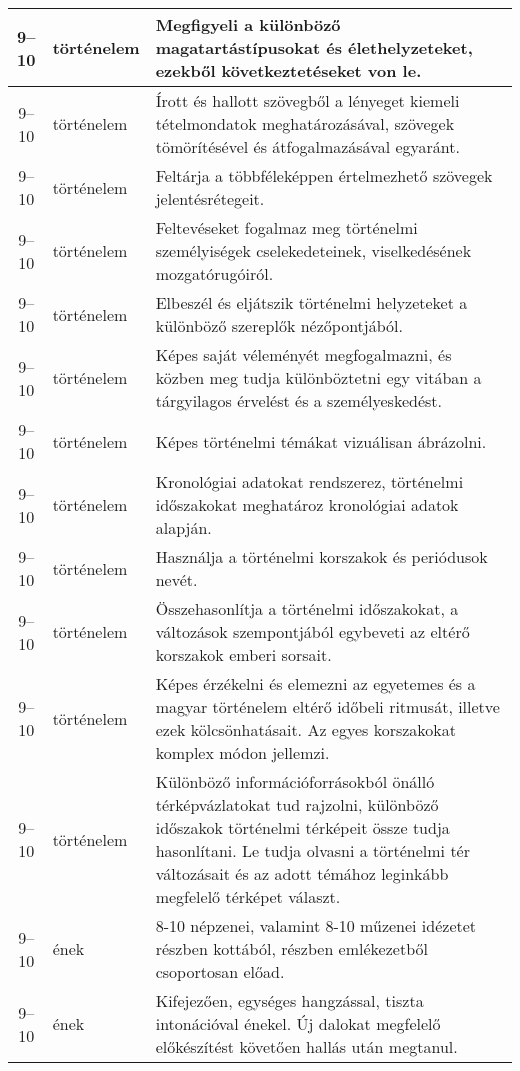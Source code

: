 \begin{small}
\begin{longtable}{c | p{2cm} |  p{11cm} }
              9--10 & történelem & Megfigyeli a különböző magatartástípusokat és élethelyzeteket, ezekből következtetéseket von le. \\ \hline
              9--10 & történelem & Írott és hallott szövegből a lényeget kiemeli tételmondatok meghatározásával, szövegek tömörítésével és átfogalmazásával egyaránt. \\ \hline
              9--10 & történelem & Feltárja a többféleképpen értelmezhető szövegek jelentésrétegeit. \\ \hline
              9--10 & történelem & Feltevéseket fogalmaz meg történelmi személyiségek cselekedeteinek, viselkedésének mozgatórugóiról. \\ \hline
              9--10 & történelem & Elbeszél és eljátszik történelmi helyzeteket a különböző szereplők nézőpontjából. \\ \hline
              9--10 & történelem & Képes saját véleményét megfogalmazni, és közben meg tudja különböztetni egy vitában a tárgyilagos érvelést és a személyeskedést. \\ \hline
              9--10 & történelem & Képes történelmi témákat vizuálisan ábrázolni. \\ \hline
              9--10 & történelem & Kronológiai adatokat rendszerez, történelmi időszakokat meghatároz kronológiai adatok alapján. \\ \hline
              9--10 & történelem & Használja a történelmi korszakok és periódusok nevét. \\ \hline
              9--10 & történelem & Összehasonlítja a történelmi időszakokat, a változások szempontjából egybeveti az eltérő korszakok emberi sorsait. \\ \hline
              9--10 & történelem & Képes érzékelni és elemezni az egyetemes és a magyar történelem eltérő időbeli ritmusát, illetve ezek kölcsönhatásait. Az egyes korszakokat komplex módon jellemzi. \\ \hline
              9--10 & történelem & Különböző információforrásokból önálló térképvázlatokat tud rajzolni, különböző időszakok történelmi térképeit össze tudja hasonlítani. Le tudja olvasni a történelmi tér változásait és az adott témához leginkább megfelelő térképet választ. \\ \hline
              9--10 & ének & 8-10 népzenei, valamint 8-10 műzenei idézetet részben kottából, részben emlékezetből csoportosan előad. \\ \hline
              9--10 & ének & Kifejezően, egységes hangzással, tiszta intonációval énekel. Új dalokat megfelelő előkészítést követően hallás után megtanul. \\ \hline

\end{longtable}
\end{small}
